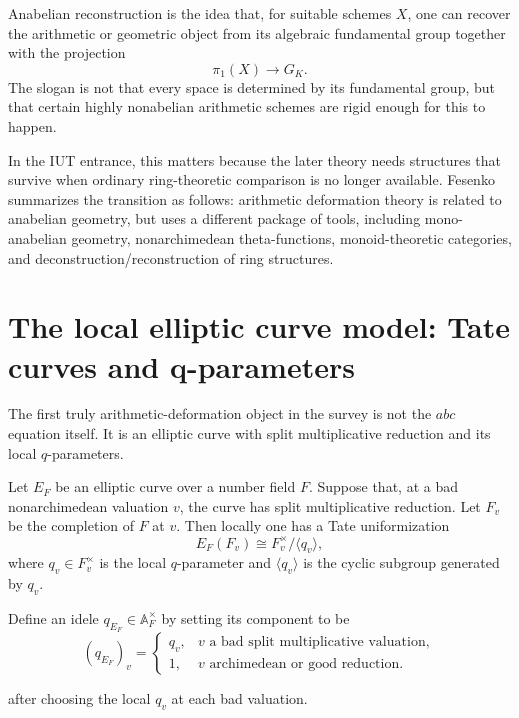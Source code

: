 \begin{definition}
Anabelian reconstruction is the idea that, for suitable schemes \(X\), one can recover the arithmetic or geometric object from its algebraic fundamental group together with the projection
\[
  \pi_1(X)\longrightarrow G_K.
\]
The slogan is not that every space is determined by its fundamental group, but that certain highly nonabelian arithmetic schemes are rigid enough for this to happen.
\end{definition}

In the IUT entrance, this matters because the later theory needs structures that survive when ordinary ring-theoretic comparison is no longer available.  Fesenko summarizes the transition as follows: arithmetic deformation theory is related to anabelian geometry, but uses a different package of tools, including mono-anabelian geometry, nonarchimedean theta-functions, monoid-theoretic categories, and deconstruction/reconstruction of ring structures.

\section{The local elliptic curve model: Tate curves and q-parameters}

The first truly arithmetic-deformation object in the survey is not the \(abc\) equation itself.  It is an elliptic curve with split multiplicative reduction and its local \(q\)-parameters.

Let \(E_F\) be an elliptic curve over a number field \(F\).  Suppose that, at a bad nonarchimedean valuation \(v\), the curve has split multiplicative reduction.  Let \(F_v\) be the completion of \(F\) at \(v\).  Then locally one has a Tate uniformization
\[
  E_F(F_v)\cong F_v^{\times}/\langle q_v\rangle,
\]
where \(q_v\in F_v^{\times}\) is the local \(q\)-parameter and \(\langle q_v\rangle\) is the cyclic subgroup generated by \(q_v\).

\begin{definition}
Define an idele \(q_{E_F}\in \mathbb A_F^{\times}\) by setting its component to be
\[
  (q_{E_F})_v=\begin{cases}
  q_v,& v\text{ a bad split multiplicative valuation},\\
  1,& v\text{ archimedean or good reduction}.
  \end{cases}
\]

after choosing the local \(q_v\) at each bad valuation.
\end{definition}

